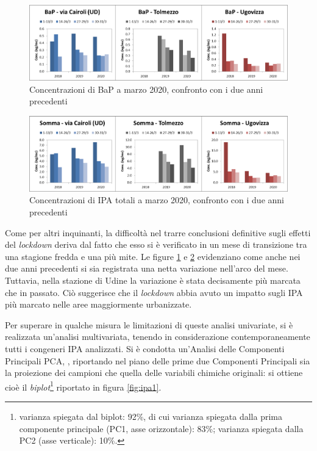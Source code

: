 \begin{figure}
    \centering
    \includegraphics[width=\textwidth]{figs/bap-barre.png}
    \caption{Concentrazioni di BaP a marzo 2020, confronto con i due anni precedenti}
    \label{fig:ipa4}
\end{figure}
\begin{figure}
    \centering
    \includegraphics[width=\textwidth]{figs/ipa-somma-barre.png}
    \caption{Concentrazioni di IPA totali a marzo 2020, confronto con i due anni precedenti}
    \label{fig:ipa5}
\end{figure}

Come per altri inquinanti, la difficoltà nel trarre conclusioni definitive sugli effetti del \textit{lockdown} deriva dal fatto che esso si è verificato in un mese di transizione tra una stagione fredda e una più mite. Le figure \ref{fig:ipa4} e \ref{fig:ipa5} evidenziano come anche nei due anni precedenti si sia registrata una netta variazione nell'arco del mese. Tuttavia, nella stazione di Udine la variazione è stata decisamente più marcata che in passato. Ciò suggerisce che il \textit{lockdown} abbia avuto un impatto sugli IPA più marcato nelle aree maggiormente urbanizzate.

Per superare in qualche misura le limitazioni di queste analisi univariate, si è realizzata un'analisi multivariata, tenendo in considerazione contemporaneamente tutti i congeneri IPA analizzati. Si è condotta un’Analisi delle Componenti Principali PCA, \citep{wold1984multivariate}, riportando nel piano delle prime due Componenti Principali sia la proiezione dei campioni che quella delle variabili chimiche originali: si ottiene cioè il \textit{biplot}\footnote{varianza spiegata dal biplot: 92\%, di cui varianza spiegata dalla prima componente principale (PC1, asse orizzontale): 83\%; varianza spiegata dalla PC2 (asse verticale): 10\%.} riportato in figura \ref{fig:ipa1}.

